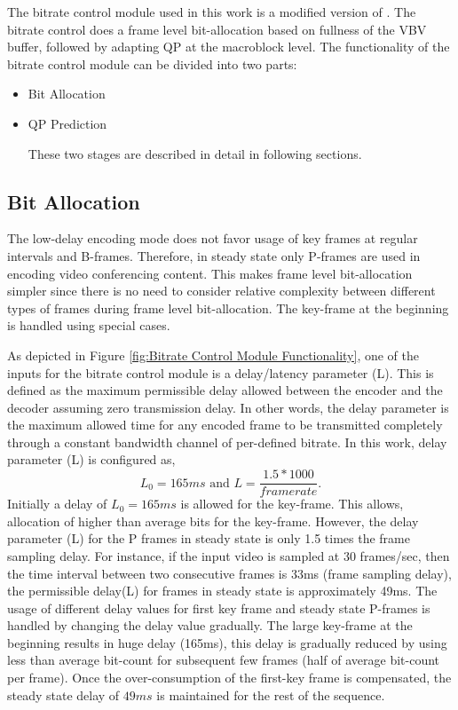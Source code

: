 \documentclass[11pt]{article} %
\begin{document}
 The bitrate control module used in this work is a modified version of \cite{JVTF086}.  The bitrate control does a frame level bit-allocation based on fullness of the VBV buffer, followed by adapting QP at the macroblock level. The functionality of the bitrate control module can be divided into two parts:
\begin{itemize}  
\item Bit Allocation
\item QP Prediction

These two stages are described in detail in following sections. 
\end{itemize}

\subsection{Bit Allocation} \label{used-bit-allocation-overview}

The low-delay encoding mode does not favor usage of key frames at regular intervals and B-frames. Therefore, in steady state only P-frames are used in encoding video conferencing content. This makes frame level bit-allocation simpler since there is no need to consider relative complexity between different types of frames during frame level bit-allocation. The key-frame at the beginning is handled using special cases.  

As depicted in Figure \ref{fig:Bitrate Control Module Functionality}, one of the inputs for the bitrate control module is a delay/latency parameter (L). This is defined as the maximum permissible delay allowed between the encoder and the decoder assuming zero transmission delay. In other words, the delay parameter is the maximum allowed time for any encoded frame to be transmitted completely through a constant bandwidth channel of per-defined bitrate. In this work, delay parameter (L) is configured as,
\begin{equation} 
	L_0 = 165 ms \text{	and	} L = \frac{1.5 * 1000}{framerate}.
\end{equation}
Initially a delay of $L_0 = 165ms$ is allowed for the key-frame. This allows, allocation of higher than average bits for the key-frame. However, the delay parameter (L) for the P frames in steady state is only 1.5 times the frame sampling delay. For instance, if the input video is sampled at 30 frames/sec, then the time interval between two consecutive frames is 33ms (frame sampling delay), the permissible delay(L) for frames in steady state is approximately 49ms. The usage of different delay values for first key frame and steady state P-frames is handled by changing the delay value gradually. The large key-frame at the beginning results in huge delay (165ms), this delay is gradually reduced by using less than average bit-count for subsequent few frames (half of average bit-count per frame). Once the over-consumption of the first-key frame is compensated, the steady state delay of $49ms$ is maintained for the rest of the sequence.
\end{document}
